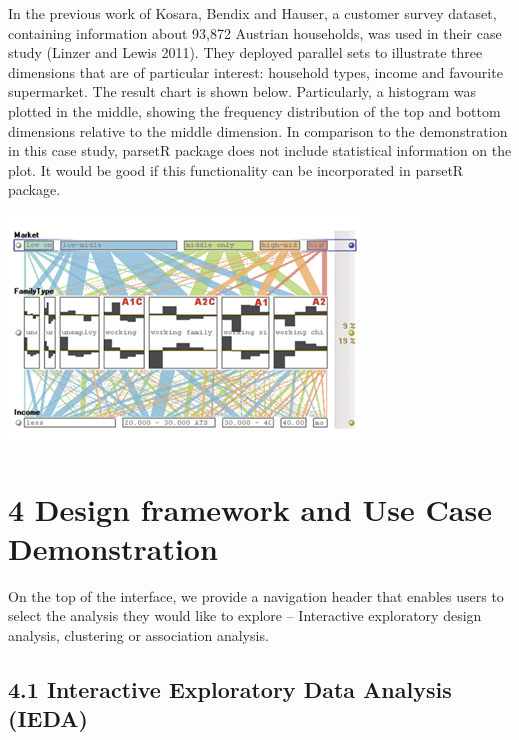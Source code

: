 \documentclass{acm_proc_article-sp}
\begin{document}
In the previous work of Kosara, Bendix and Hauser, a customer survey
dataset, containing information about 93,872 Austrian households, was
used in their case study (Linzer and Lewis 2011). They deployed parallel
sets to illustrate three dimensions that are of particular interest:
household types, income and favourite supermarket. The result chart is
shown below. Particularly, a histogram was plotted in the middle,
showing the frequency distribution of the top and bottom dimensions
relative to the middle dimension. In comparison to the demonstration in
this case study, parsetR package does not include statistical
information on the plot. It would be good if this functionality can be
incorporated in parsetR package.

\begin{center}\includegraphics[width=1\linewidth]{1} \end{center}

\hypertarget{design-framework-and-use-case-demonstration}{%
\section{4 Design framework and Use Case
Demonstration}\label{design-framework-and-use-case-demonstration}}

On the top of the interface, we provide a navigation header that enables
users to select the analysis they would like to explore -- Interactive
exploratory design analysis, clustering or association analysis.

\hypertarget{interactive-exploratory-data-analysis-ieda-1}{%
\subsection{4.1 Interactive Exploratory Data Analysis
(IEDA)}\label{interactive-exploratory-data-analysis-ieda-1}}
\end{document}
